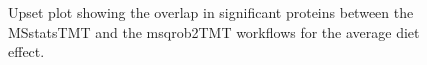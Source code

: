 \documentclass[
  letterpaper,
  DIV=11,
  numbers=noendperiod]{scrartcl}
\begin{document}
\begin{figure}[H]


\caption{\label{fig-Upset-avg}Upset plot showing the overlap in
significant proteins between the MSstatsTMT and the msqrob2TMT workflows
for the average diet effect.}

\end{figure}%
\end{document}
